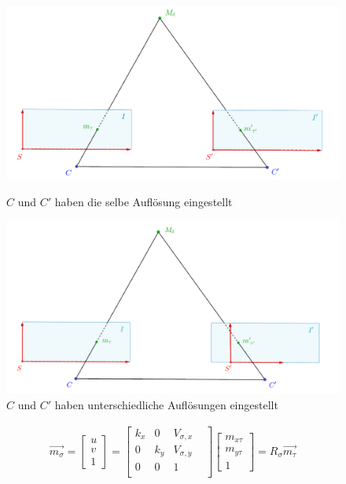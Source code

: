 \begin{figure}[!htb]
	\includegraphics[width=\linewidth]{images/SensorSelbeAufloesung_beschriftet.png}
	\caption{$C$ und $C'$ haben die selbe Auflösung eingestellt}
	\label{fig:Aufl1}
	\endminipage\hfill
	\includegraphics[width=\linewidth]{images/SensorUnterschiedlicheAufloesung_beschriftet.png}
	\caption{$C$ und $C'$ haben unterschiedliche Auflösungen eingestellt}
	\label{fig:Aufl2}
	\endminipage\hfill
\end{figure}


\begin{gather}
\vec{m_\sigma}=\begin{bmatrix}u \\v\\1 \end{bmatrix}=
\begin{bmatrix}
k_x&0&V_{\sigma,x}\\
0&k_y&V_{\sigma,y}\\
0&0&1&\\
\end{bmatrix}
\begin{bmatrix}m_{x \tau}\\ m_{y \tau}\\ 1\end{bmatrix}= R_\sigma \vec{m_\tau}\\
\end{gather}

